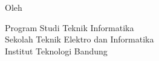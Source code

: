 \clearpage
\pagestyle{empty}

\begin{center}
    \smallskip

    \Large \bfseries \MakeUppercase{\thetitle}
    \vfill

    \subtitle
    \vfill

    \large Oleh

    \Large \theauthor

    \large Program Studi Teknik Informatika \\

    \normalsize \normalfont
    Sekolah Teknik Elektro dan Informatika \\
    Institut Teknologi Bandung

    \vfill
    \pembimbingTtd

\end{center}
\clearpage
